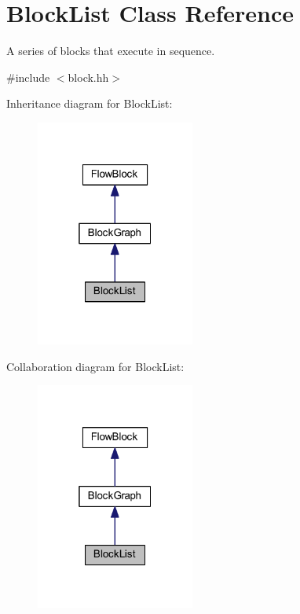 \hypertarget{class_block_list}{}\section{Block\+List Class Reference}
\label{class_block_list}


A series of blocks that execute in sequence.  




{\ttfamily \#include $<$block.\+hh$>$}



Inheritance diagram for Block\+List\+:
\nopagebreak
\begin{figure}[H]
\begin{center}
\leavevmode
\includegraphics[width=148pt]{class_block_list__inherit__graph}
\end{center}
\end{figure}


Collaboration diagram for Block\+List\+:
\nopagebreak
\begin{figure}[H]
\begin{center}
\leavevmode
\includegraphics[width=148pt]{class_block_list__coll__graph}
\end{center}
\end{figure}

